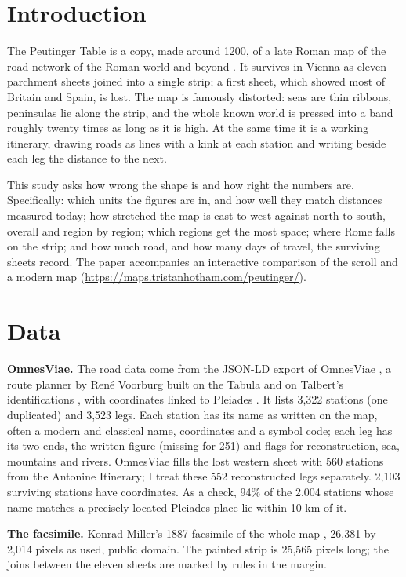 \documentclass[11pt,a4paper]{article}
\begin{document}
\section{Introduction}
The Peutinger Table is a copy, made around 1200, of a late Roman map of the road network of the Roman world and beyond \citep{talbert}. It survives in Vienna as eleven parchment sheets joined into a single strip; a first sheet, which showed most of Britain and Spain, is lost. The map is famously distorted: seas are thin ribbons, peninsulas lie along the strip, and the whole known world is pressed into a band roughly twenty times as long as it is high. At the same time it is a working itinerary, drawing roads as lines with a kink at each station and writing beside each leg the distance to the next.

This study asks how wrong the shape is and how right the numbers are. Specifically: which units the figures are in, and how well they match distances measured today; how stretched the map is east to west against north to south, overall and region by region; which regions get the most space; where Rome falls on the strip; and how much road, and how many days of travel, the surviving sheets record. The paper accompanies an interactive comparison of the scroll and a modern map (\url{https://maps.tristanhotham.com/peutinger/}).

\section{Data}
\textbf{OmnesViae.} The road data come from the JSON-LD export of OmnesViae \citep{omnesviae}, a route planner by Ren\'e Voorburg built on the Tabula and on Talbert's identifications \citep{talbert}, with coordinates linked to Pleiades \citep{pleiades}. It lists 3,322 stations (one duplicated) and 3,523 legs. Each station has its name as written on the map, often a modern and classical name, coordinates and a symbol code; each leg has its two ends, the written figure (missing for 251) and flags for reconstruction, sea, mountains and rivers. OmnesViae fills the lost western sheet with 560 stations from the Antonine Itinerary; I treat these 552 reconstructed legs separately. 2,103 surviving stations have coordinates. As a check, 94\% of the 2,004 stations whose name matches a precisely located Pleiades place lie within 10 km of it.

\textbf{The facsimile.} Konrad Miller's 1887 facsimile of the whole map \citep{miller}, 26,381 by 2,014 pixels as used, public domain. The painted strip is 25,565 pixels long; the joins between the eleven sheets are marked by rules in the margin.
\end{document}
